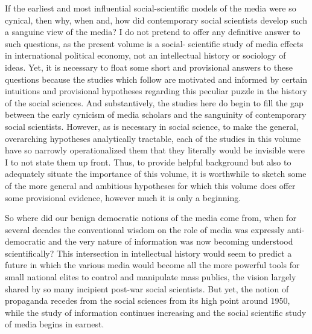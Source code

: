 If the earliest and most influential social-scientific models of the media were so cynical, then
why, when and, how did contemporary social scientists develop such a sanguine view of the media? I
do not pretend to offer any definitive answer to such questions, as the present volume is a social-
scientific study of media effects in international political economy, not an intellectual history or
sociology of ideas. Yet, it is necessary to float some short and provisional answers to these
questions because the studies which follow are motivated and informed by certain intuitions and
provisional hypotheses regarding this peculiar puzzle in the history of the social sciences. And
substantively, the studies here do begin to fill the gap between the early cynicism of media
scholars and the sanguinity of contemporary social scientists. However, as is necessary in social
science, to make the general, overarching hypotheses analytically tractable, each of the studies in
this volume have so narrowly operationalized them that they literally would be invisible were I to
not state them up front. Thus, to provide helpful background but also to adequately situate the
importance of this volume, it is worthwhile to sketch some of the more general and ambitious
hypotheses for which this volume does offer some provisional evidence, however much it is only a
beginning.

So where did our benign democratic notions of the media come from, when for several decades the
conventional wisdom on the role of media was expressly anti-democratic and the very nature of
information was now becoming understood scientifically? This intersection in intellectual history
would seem to predict a future in which the various media would become all the more powerful tools
for small national elites to control and manipulate mass publics, the vision largely shared by so
many incipient post-war social scientists. But yet, the notion of propaganda recedes from the social
sciences from its high point around 1950, while the study of information continues increasing and
the social scientific study of media begins in earnest.

